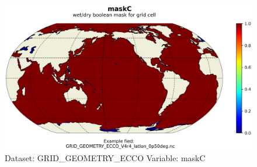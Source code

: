 \begin{figure}[H]
\centering
\includegraphics[scale=0.55]{../images/plots/latlon_plots_coords/Geometry_Parameters_for_the_0.5_degree_Lat-Lon_Model_Grid_(Version_4_Release_4)/maskC.png}
\caption{Dataset: GRID\_GEOMETRY\_ECCO Variable: maskC}
\label{tab:table-GRID_GEOMETRY_ECCO_maskC-Plot}
\end{figure}